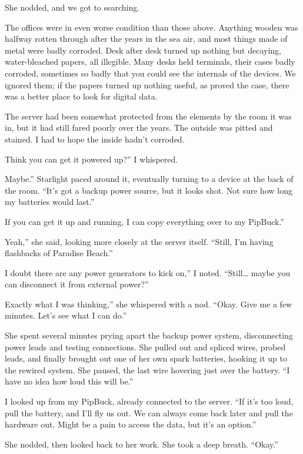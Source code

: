 She nodded, and we got to searching.

The offices were in even worse condition than those above. Anything wooden was halfway rotten through after the years in the sea air, and most things made of metal were badly corroded. Desk after desk turned up nothing but decaying, water-bleached papers, all illegible. Many desks held terminals, their cases badly corroded, sometimes so badly that you could see the internals of the devices. We ignored them; if the papers turned up nothing useful, as proved the case, there was a better place to look for digital data.

The server had been somewhat protected from the elements by the room it was in, but it had still fared poorly over the years. The outside was pitted and stained. I had to hope the inside hadn’t corroded.

\leavevmode{}Think you can get it powered up?” I whispered.

\leavevmode{}Maybe.” Starlight paced around it, eventually turning to a device at the back of the room. “It’s got a backup power source, but it looks shot. Not sure how long my batteries would last.”

\leavevmode{}If you can get it up and running, I can copy everything over to my PipBuck.”

\leavevmode{}Yeah,” she said, looking more closely at the server itself. “Still, I’m having flashbacks of Paradise Beach.”

\leavevmode{}I doubt there are any power generators to kick on,” I noted. “Still… maybe you can disconnect it from external power?”

\leavevmode{}Exactly what I was thinking,” she whispered with a nod. “Okay. Give me a few minutes. Let’s see what I can do.”

She spent several minutes prying apart the backup power system, disconnecting power leads and testing connections. She pulled out and spliced wires, probed leads, and finally brought out one of her own spark batteries, hooking it up to the rewired system. She paused, the last wire hovering just over the battery. “I have no idea how loud this will be.”

I looked up from my PipBuck, already connected to the server. “If it’s too loud, pull the battery, and I’ll fly us out. We can always come back later and pull the hardware out. Might be a pain to access the data, but it’s an option.”

She nodded, then looked back to her work. She took a deep breath. “Okay.”

